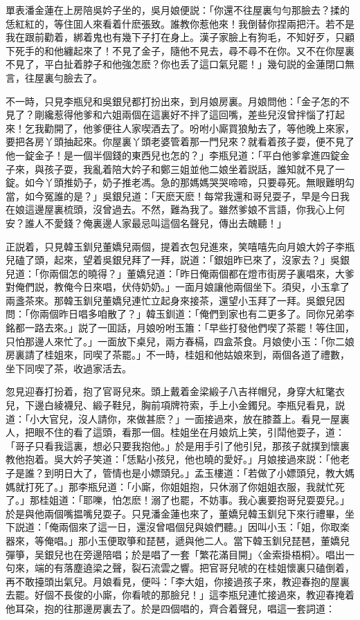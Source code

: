 單表潘金蓮在上房陪吳妗子坐的，吳月娘便説：「你還不往屋裏勻勻那臉去？揉的恁紅紅的，等住囬人來看着什麽張致。誰教你惹他來！我倒替你捏兩把汗。若不是我在跟前勸着，綁着鬼也有幾下子打在身上。漢子家臉上有狗毛，不知好歹，只顧下死手的和他纏起來了！不見了金子，隨他不見去，尋不尋不在你。又不在你屋裏不見了，平白扯着脖子和他強怎麽？你也丢了這口氣兒罷！」幾句説的金蓮閉口無言，往屋裏勻臉去了。

不一時，只見李瓶兒和吳銀兒都打扮出來，到月娘房裏。月娘問他：「金子怎的不見了？剛纔惹得他爹和六姐兩個在這裏好不拌了這回嘴，差些兒沒曾拌惱了打起來！乞我勸開了，他爹便往人家喫酒去了。吩咐小廝買狼觔去了，等他晚上來家，要把各房丫頭抽起來。你屋裏丫頭老婆管着那一門兒來？就看着孩子耍，便不見了他一錠金子！是一個半個錢的東西兒也怎的？」李瓶兒道：「平白他爹拿進四錠金子來，與孩子耍，我亂着陪大妗子和鄭三姐並他二娘坐着説話，誰知就不見了一錠。如今丫頭推奶子，奶子推老馮。急的那媽媽哭哭啼啼，只要尋死。無眼難明勾當，如今冤誰的是？」吳銀兒道：「天麽天麽！每常我還和哥兒耍子，早是今日我在娘這邊屋裏梳頭，沒曾過去。不然，難為我了。雖然爹娘不言語，你我心上何安？誰人不愛錢？俺裏邊人家最忌叫這個名聲兒，傳出去醜聽！」

正説着，只見韓玉釧兒董嬌兒兩個，提着衣包兒進來，笑嘻嘻先向月娘大妗子李瓶兒磕了頭，起來，望着吳銀兒拜了一拜，説道：「銀姐昨已來了，沒家去？」吳銀兒道：「你兩個怎的曉得？」董嬌兒道：「昨日俺兩個都在燈巿街房子裏唱來，大爹對俺們説，教俺今日來唱，伏侍奶奶。」一面月娘讓他兩個坐下。須臾，小玉拿了兩盞茶來。那韓玉釧兒董嬌兒連忙立起身來接茶，還望小玉拜了一拜。吳銀兒因問：「你兩個昨日唱多咱散了？」韓玉釧道：「俺們到家也有二更多了。同你兄弟李銘都一路去來。」説了一囬話，月娘吩咐玉簫：「早些打發他們喫了茶罷！等住囬，只怕那邊人來忙了。」一面放下桌兒，兩方春槅，四盒茶食。月娘使小玉：「你二娘房裏請了桂姐來，同喫了茶罷。」不一時，桂姐和他姑娘來到，兩個各道了禮數，坐下同喫了茶，收過家活去。

忽見迎春打扮着，抱了官哥兒來。頭上戴着金梁緞子八吉祥帽兒，身穿大紅氅衣兒，下邊白綾襪兒、緞子鞋兒，胸前項牌符索，手上小金鐲兒。李瓶兒看見，説道：「小大官兒，沒人請你，來做甚麽？」一面接過來，放在膝蓋上。看見一屋裏人，把眼不住的看了這頭，看那一個。桂姐坐在月娘炕上笑，引鬦他耍子，道：「哥子只看我這裏，想必只要我抱他。」於是用手引了他引兒，那孩子就撲到懷裏教他抱着。吳大妗子笑道：「恁點小孩兒，他也曉的愛好。」月娘接過來説：「他老子是誰？到明日大了，管情也是小嫖頭兒。」孟玉樓道：「若做了小嫖頭兒，教大媽媽就打死了。」那李瓶兒道：「小廝，你姐姐抱，只休溺了你姐姐衣服，我就忙死了。」那桂姐道：「耶嚛，怕怎麽！溺了也罷，不妨事。我心裏要抱哥兒耍耍兒。」於是與他兩個嘴揾嘴兒耍子。只見潘金蓮也來了，董嬌兒韓玉釧兒下來行禮畢，坐下説道：「俺兩個來了這一日，還沒曾唱個兒與娘們聽。」因叫小玉：「姐，你取楽器來，等俺唱。」那小玉便取箏和琵琶，遞與他二人。當下韓玉釧兒琵琶，董嬌兒彈箏，吴銀兒也在旁邊陪唱；於是唱了一套「繁花滿目開」〈金索掛梧桐〉。唱出一句來，端的有落塵遶梁之聲，裂石流雲之響。把官哥兒唬的在桂姐懷裏只磕倒着，再不敢擡頭出氣兒。月娘看見，便呌：「李大姐，你接過孩子來，教迎春抱的屋裏去罷。好個不長俊的小廝，你看唬的那臉兒！」這李瓶兒連忙接過來，教迎春掩着他耳朶，抱的往那邊房裏去了。於是四個唱的，齊合着聲兒，唱這一套詞道：

